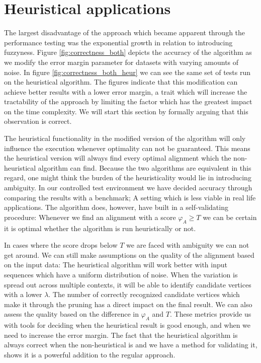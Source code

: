 \documentclass[thesis.tex]{subfiles}
\begin{document}
\section{Heuristical applications}
\label{sec:heuristical_applications}
The largest disadvantage of the approach which became apparent through the performance testing was the exponential growth in relation to introducing fuzzyness. Figure \ref{fig:correctness_both} depicts the accuracy of the algorithm as we modify the error margin parameter for datasets with varying amounts of noise. In figure \ref{fig:correctness_both_heur} we can see the same set of tests run on the heuristical algorithm. The figures indicate that this modification can achieve better results with a lower error margin, a trait which will increase the tractability of the approach by limiting the factor which has the greatest impact on the time complexity. We will start this section by formally arguing that this observation is correct.\\
\par\noindent
The heuristical functionality in the modified version of the algorithm will only influence the execution whenever optimality can not be guaranteed. This means the heuristical version will always find every optimal alignment which the non-heuristical algorithm can find. Because the two algorithms are equivalent in this regard, one might think the burden of the heuristicality would lie in introducing ambiguity. In our controlled test environment we have decided accuracy through comparing the results with a benchmark; A setting which is less viable in real life applications. The algorithm does, however, have built in a self-validating procedure: Whenever we find an alignment with a score $\varphi_A \geq T$ we can be certain it is optimal whether the algorithm is run heuristically or not.\\
\par\noindent
In cases where the score drops below $T$ we are faced with ambiguity we can not get around. We can still make assumptions on the quality of the alignment based on the input data: The heuristical algorithm will work better with input sequences which have a uniform distribution of noise. When the variation is spread out across multiple contexts, it will be able to identify candidate vertices with a lower $\lambda$. The number of correctly recognized candidate vertices which make it through the pruning has a direct impact on the final result. We can also assess the quality based on the difference in $\varphi_A$ and $T$. These metrics provide us with tools for deciding when the heuristical result is good enough, and when we need to increase the error margin. The fact that the heuristical algorithm is always correct when the non-heuristical is and we have a method for validating it, shows it is a powerful addition to the regular approach.\\
\end{document}
